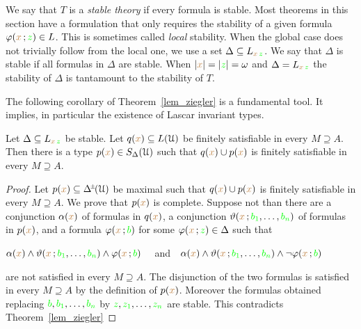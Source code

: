 \def\ceq#1#2#3{\parbox{20ex}{$\displaystyle #1$}\medrel{#2}$\displaystyle  #3$}

We say that $T$ is a \emph{stable theory\/} if every formula is stable.
Most theorems in this section have a formulation that only requires the stability of a given formula $\varphi({\color{brown} x}\,;{\color{green} z})\in L$.
This is sometimes called \textit{local\/} stability.
When the global case does not trivially follow from the local one, we use a set $\Delta\subseteq L_{{\color{brown} x}\,{\color{green} z}}$.
We say that $\Delta$ is stable if all formulas in $\Delta$ are stable.
When $|{\color{brown} x}|=|{\color{green} z}|=\omega$ and $\Delta=L_{{\color{brown} x}\,{\color{green} z}}$ the stability of $\Delta$ is tantamount to the stability of $T$.

The following corollary of Theorem~\ref{lem_ziegler} is a fundamental tool.
It implies, in particular the existence of Lascar invariant types.

\begin{corollary}\label{corol_stable_coheir_over_models}
  Let  $\Delta\subseteq L_{{\color{brown} x}\,{\color{green} z}}$ be stable.
  Let $q({\color{brown} x})\subseteq L(\EuScript U)$ be finitely satisfiable in every $M\supseteq A$.
  Then there is a type $p({\color{brown} x})\in S_\Delta(\EuScript U)$ such that $q({\color{brown} x})\cup p({\color{brown} x})$ is finitely satisfiable in every $M\supseteq A$.
\end{corollary}

\begin{proof}
  Let $p({\mr x})\subseteq \pmDelta(\U)$ be maximal such that $q({\color{brown} x})\cup p({\color{brown} x})$ is finitely satisfiable in every $M\supseteq A$.
  We prove that $p({\color{brown} x})$ is complete.
  Suppose not than there are a conjunction $\alpha({\color{brown} x})$ of formulas in $q({\color{brown} x})$, a conjunction $\vartheta({\color{brown} x}\,;{\color{green} b_1},\dots,{\color{green} b_n})$ of formulas in $p({\color{brown} x})$, and a formula $\varphi({\color{brown} x}\,;{\color{green} b})$ for some $\varphi({\color{brown} x}\,;{\color{green} z})\in\Delta$ such that 

  \hfil$\alpha({\color{brown} x})\wedge\vartheta({\color{brown} x}\,;{\color{green} b_1},\dots,{\color{green} b_n})\wedge\varphi({\color{brown} x}\,;{\color{green} b})$ \ \ and\ \   $\alpha({\color{brown} x})\wedge\vartheta({\color{brown} x}\,;{\color{green} b_1},\dots,{\color{green} b_n})\wedge\neg\varphi({\color{brown} x}\,;{\color{green} b})$ 
 
  are not satisfied in every $M\supseteq A$.
  The disjunction of the two formulas is satisfied in every $M\supseteq A$ by the definition of $p({\color{brown} x})$.
  Moreover the formulas obtained replacing ${\color{green} b},{\color{green} b_1},\dots,{\color{green} b_n}$ by ${\color{green} z},{\color{green} z_1},\dots,{\color{green} z_n}$ are stable.
  This contradicts Theorem~\ref{lem_ziegler}
\end{proof}

